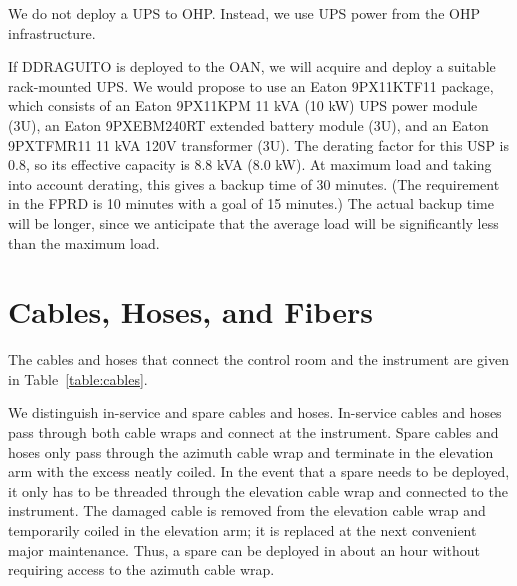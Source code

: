 \documentclass{article}
\newcounter{requirement}
\begin{document}
We do not deploy a UPS to OHP. Instead, we use UPS power from the OHP infrastructure.

If DDRAGUITO is deployed to the OAN, we will acquire and deploy a suitable rack-mounted UPS. We would propose to use an Eaton 9PX11KTF11 package, which consists of an Eaton 9PX11KPM 11 kVA (10 kW) UPS power module (3U), an 
Eaton 9PXEBM240RT extended battery module (3U), and an 
Eaton 9PXTFMR11 11 kVA 120V transformer (3U). The derating factor for this USP is 0.8, so its effective capacity is 8.8 kVA (8.0 kW).
At maximum load and taking into account derating, this gives a backup time of 30 minutes. (The requirement in the FPRD is 10 minutes with a goal of 15 minutes.) The actual backup time will be longer, since we anticipate that the average load will be significantly less than the maximum load.




\clearpage
\section{Cables, Hoses, and Fibers}

The cables and hoses that connect the control room and the instrument are given in Table~\ref{table:cables}.

We distinguish in-service and spare cables and hoses. In-service cables and hoses pass through both cable wraps and connect at the instrument. Spare cables and hoses only pass through the azimuth cable wrap and terminate in the elevation arm with the excess neatly coiled. In the event that a spare needs to be deployed, it only has to be threaded through the elevation cable wrap and connected to the instrument. The damaged cable is removed from the elevation cable wrap and temporarily coiled in the elevation arm; it is replaced at the next convenient major maintenance. Thus, a spare can be deployed in about an hour without requiring access to the azimuth cable wrap. 
\end{document}
